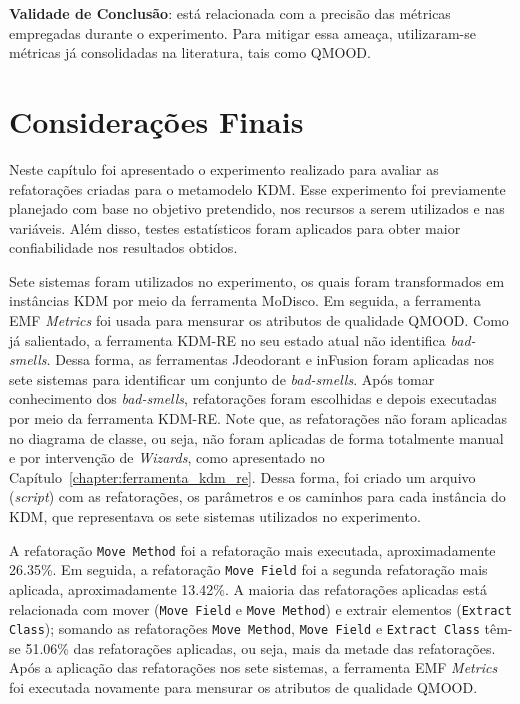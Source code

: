 \textbf{Validade de Conclusão}: está relacionada com a precisão das métricas empregadas durante o experimento. Para mitigar essa ameaça, utilizaram-se métricas já consolidadas na literatura, tais como QMOOD. 

\section{Considerações Finais}\label{sec:consideracoes_finais_experimento}

Neste capítulo foi apresentado o experimento realizado para avaliar as refatorações criadas para o metamodelo KDM. Esse experimento foi previamente planejado com base no objetivo pretendido, nos recursos a serem utilizados e nas variáveis. Além disso, testes estatísticos foram aplicados para obter maior confiabilidade nos resultados obtidos.

Sete sistemas foram utilizados no experimento, os quais foram transformados em instâncias KDM por meio da ferramenta MoDisco. Em seguida, a ferramenta EMF \textit{Metrics} foi usada para mensurar os atributos de qualidade QMOOD. Como já salientado, a ferramenta KDM-RE no seu estado atual não identifica \textit{bad-smells}. Dessa forma, as ferramentas Jdeodorant e inFusion foram aplicadas nos sete sistemas para identificar um conjunto de  \textit{bad-smells}. Após tomar conhecimento dos \textit{bad-smells}, refatorações foram escolhidas e depois executadas por meio da ferramenta KDM-RE. Note que, as refatorações não foram aplicadas no diagrama de classe, ou seja, não foram aplicadas de forma totalmente manual e por intervenção de \textit{Wizards}, como apresentado no Capítulo~\ref{chapter:ferramenta_kdm_re}. Dessa forma, foi criado um arquivo (\textit{script}) com as refatorações, os parâmetros e os caminhos para cada instância do KDM, que representava os sete sistemas utilizados no experimento.

A refatoração \texttt{Move Method} foi a refatoração mais executada, aproximadamente 26.35\%.  Em seguida, a refatoração \texttt{Move Field} foi a segunda refatoração mais aplicada, aproximadamente 13.42\%. A maioria das refatorações aplicadas está relacionada com mover (\texttt{Move Field} e \texttt{Move Method}) e extrair elementos (\texttt{Extract Class}); somando as refatorações \texttt{Move Method}, \texttt{Move Field} e \texttt{Extract Class} têm-se 51.06\% das refatorações aplicadas, ou seja, mais da metade das refatorações. Após a aplicação das refatorações nos sete sistemas, a ferramenta EMF \textit{Metrics} foi executada novamente para mensurar os atributos de qualidade QMOOD.

